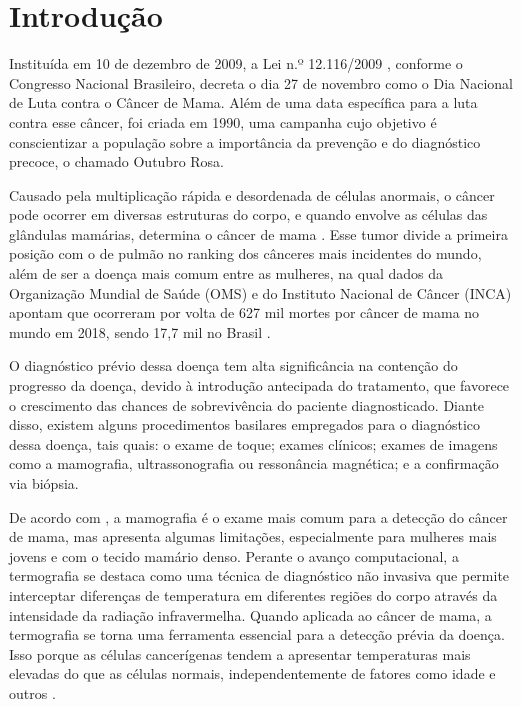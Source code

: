 
\section{\esp Introdução} \label{intro}

Instituída em 10 de dezembro de 2009, a Lei n.º 12.116/2009 , conforme o Congresso Nacional Brasileiro, decreta o dia 27 de novembro como o Dia Nacional de Luta contra o Câncer de Mama. Além de uma data específica para a luta contra esse câncer, foi criada em 1990, uma campanha cujo objetivo é conscientizar a população sobre a importância da prevenção e do diagnóstico precoce, o chamado Outubro Rosa.

Causado pela multiplicação rápida e desordenada de células anormais, o câncer pode ocorrer em diversas estruturas do corpo, e quando envolve as células das glândulas mamárias, determina o câncer de mama \cite{incaoquee}. Esse tumor divide a primeira posição com o de pulmão no ranking dos cânceres mais incidentes do mundo, além de ser a doença mais comum entre as mulheres, na qual dados da Organização Mundial de Saúde (OMS) e do Instituto Nacional de Câncer (INCA) apontam que ocorreram por volta de 627 mil mortes por câncer de mama no mundo em 2018, sendo 17,7 mil no Brasil \cite{boletimepidemiologico}.

O diagnóstico prévio dessa doença tem alta significância na contenção do progresso da doença, devido à introdução antecipada do tratamento, que favorece o crescimento das chances de sobrevivência do paciente diagnosticado. Diante disso, existem alguns procedimentos basilares empregados para o diagnóstico dessa doença, tais quais: o exame de toque; exames clínicos; exames de imagens como a mamografia, ultrassonografia ou ressonância magnética; e a confirmação via biópsia.

De acordo com , a mamografia é o exame mais comum para a detecção do câncer de mama, mas apresenta algumas limitações, especialmente para mulheres mais jovens e com o tecido mamário denso. Perante o avanço computacional, a termografia se destaca como uma técnica de diagnóstico não invasiva que permite interceptar diferenças de temperatura em diferentes regiões do corpo através da intensidade da radiação infravermelha. Quando aplicada ao câncer de mama, a termografia se torna uma ferramenta essencial para a detecção prévia da doença. Isso porque as células cancerígenas tendem a apresentar temperaturas mais elevadas do que as células normais, independentemente de fatores como idade e outros \cite{leles}.

